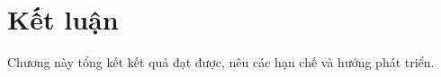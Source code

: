 \chapter{Kết luận}\label{chap:conclusion}
Chương này tổng kết kết quả đạt được, nêu các hạn chế và hướng phát triển.


